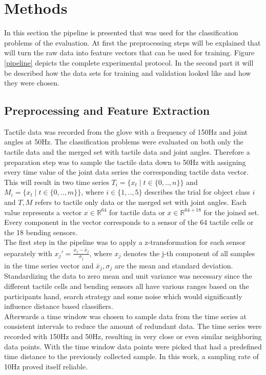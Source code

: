 \section{Methods}
In this section the pipeline is presented that was used for the classification problems of the evaluation. At first the preprocessing steps will be explained that will turn the raw data into feature vectors that can be used for training. Figure \ref{pipeline} depicts the complete experimental protocol. In the second part it will be described how the data sets for training and validation looked like and how they were chosen.

\subsection{Preprocessing and Feature Extraction}
Tactile data was recorded from the glove with a frequency of 150Hz and joint angles at 50Hz. The classification problems were evaluated on both only the tactile data and the merged set with tactile data and joint angles. Therefore a preparation step was to sample the tactile data down to 50Hz with assigning every time value of the joint data series the corresponding tactile data vector. This will result in two time series $ T_{i} = \{x_{t} \mid t \in \{0,..,n\}\} $ and $ M_{i} = \{x_{t} \mid t \in \{0,..,m\}\} $, where $ i \in \{1,..,5\}$ describes the trial for object class $i$ and $ T,M $ refers to tactile only data or the merged set with joint angles. Each value represents a vector $x \in \mathbb{R}^{64}$ for tactile data or $ x \in \mathbb{R}^{64+18} $ for the joined set. Every component in the vector corresponds to a sensor of the 64 tactile cells or the 18 bending sensors.\\
The first step in the pipeline was to apply a z-transformation for each sensor separately with $ x_{j}' = \frac{x_{j}-\bar{x}_{j}}{\sigma_{j}} $, where $ x_{j} $ denotes the j-th component of all samples in the time series vector and $ \bar{x}_{j},\sigma_{j} $ are the mean and standard deviation. Standardizing the data to zero mean and unit variance was necessary since the different tactile cells and bending sensors all have various ranges based on the participants hand, search strategy and some noise which would significantly influence distance based classifiers.\\
Afterwards a time window was chosen to sample data from the time series at consistent intervals to reduce the amount of redundant data. The time series were recorded with 150Hz and 50Hz, resulting in very close or even similar neighboring data points. With the time window data points were picked that had a predefined time distance to the previously collected sample. In this work, a sampling rate of 10Hz proved itself reliable.\\
